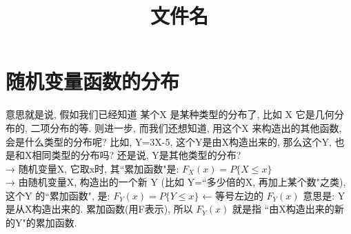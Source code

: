 \documentclass[UTF8]{ctexart}
\title{文件名}
\begin{document}
	\tableofcontents %
	\date{} %
	\maketitle  %
	
	
	
	
	
	
	\part{随机变量函数的分布}
	
	意思就是说, 假如我们已经知道 某个X 是某种类型的分布了, 比如 X 它是几何分布的, 二项分布的等. 则进一步, 而我们还想知道, 用这个X 来构造出的其他函数, 会是什么类型的分布呢? 比如, Y=3X-5,  这个Y是由X构造出来的, 那么这个Y, 也是和X相同类型的分布吗? 还是说, Y是其他类型的分布? \\
	
	→ 随机变量X, 它取x时, 其``累加函数"是: $\boxed{F_X (x)=P\{X \leq x\}}$ \\	
	
	→ 由随机变量X, 构造出的一个新 Y (比如 Y=``多少倍的X, 再加上某个数"之类), 这个Y 的``累加函数", 是: $\boxed{F_Y(x)=P\{Y \leq x\}}$  	← 等号左边的 $F_Y(x)$ 意思是: Y是从X构造出来的.  累加函数(用F表示), 所以 $F_Y(x)$ 就是指 ``由X构造出来的新的Y"的累加函数. \\
	
	
	
	
	
\end{document}
